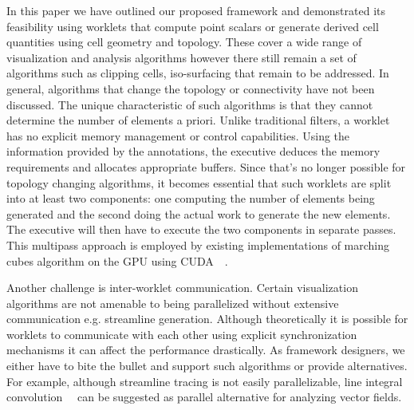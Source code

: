 \documentclass{vgtc}                          %
\newcommand*{\lcite}[1]{~\cite{#1}}
\newcommand*{\keyterm}[1]{\emph{#1}}
\begin{document}
In this paper we have outlined our proposed framework and demonstrated its
feasibility using worklets that compute point scalars or generate derived cell
quantities using cell geometry and topology. These cover a wide range of
visualization and analysis algorithms however there still remain a set of
algorithms such as clipping cells, iso-surfacing that remain to be addressed. In
general, algorithms that change the topology or connectivity have not been
discussed. The unique characteristic of such algorithms is that they cannot
determine the number of elements a priori. Unlike traditional filters, a
worklet has no explicit memory management or control capabilities. Using the
information provided by the annotations, the executive deduces the memory
requirements and allocates appropriate buffers. Since that's no longer possible
for topology changing algorithms, it becomes essential that such worklets are
split into at least two components: one computing the number of elements being
generated and the second doing the actual work to generate the new elements. The
executive will then have to execute the two components in separate passes. This
multipass approach is employed by existing implementations of marching
cubes algorithm on the GPU using CUDA~\lcite{CudaMarchingCubes}.

Another challenge is inter-worklet communication. Certain visualization
algorithms are not amenable to being parallelized without extensive 
communication e.g. streamline generation. Although theoretically it is possible
for worklets to communicate with each other using explicit synchronization
mechanisms it can affect the performance drastically. As framework designers, we
either have to bite the bullet and support such algorithms or provide
alternatives. For example, although streamline tracing is not easily parallelizable,
line integral convolution~\lcite{SurfaceLIC} can be suggested as parallel
alternative for analyzing vector fields.





\end{document}
